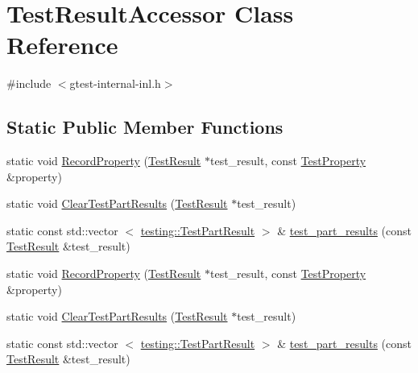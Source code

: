\hypertarget{classtesting_1_1internal_1_1TestResultAccessor}{\section{\-Test\-Result\-Accessor \-Class \-Reference}
\label{db/d32/classtesting_1_1internal_1_1TestResultAccessor}
}


{\ttfamily \#include $<$gtest-\/internal-\/inl.\-h$>$}

\subsection*{\-Static \-Public \-Member \-Functions}
\begin{DoxyCompactItemize}
\item 
static void \hyperlink{classtesting_1_1internal_1_1TestResultAccessor_ae1e40c9bdc29a0f91fc07cf688f8f66f}{\-Record\-Property} (\hyperlink{classtesting_1_1TestResult}{\-Test\-Result} $\ast$test\-\_\-result, const \hyperlink{classtesting_1_1TestProperty}{\-Test\-Property} \&property)
\item 
static void \hyperlink{classtesting_1_1internal_1_1TestResultAccessor_aa2da51f41436229f032c3ea7cffc53e1}{\-Clear\-Test\-Part\-Results} (\hyperlink{classtesting_1_1TestResult}{\-Test\-Result} $\ast$test\-\_\-result)
\item 
static const std\-::vector\*
$<$ \hyperlink{classtesting_1_1TestPartResult}{testing\-::\-Test\-Part\-Result} $>$ \& \hyperlink{classtesting_1_1internal_1_1TestResultAccessor_a018e4cce093eef01adc2d4cd6d1371bf}{test\-\_\-part\-\_\-results} (const \hyperlink{classtesting_1_1TestResult}{\-Test\-Result} \&test\-\_\-result)
\item 
static void \hyperlink{classtesting_1_1internal_1_1TestResultAccessor_ae1e40c9bdc29a0f91fc07cf688f8f66f}{\-Record\-Property} (\hyperlink{classtesting_1_1TestResult}{\-Test\-Result} $\ast$test\-\_\-result, const \hyperlink{classtesting_1_1TestProperty}{\-Test\-Property} \&property)
\item 
static void \hyperlink{classtesting_1_1internal_1_1TestResultAccessor_aa2da51f41436229f032c3ea7cffc53e1}{\-Clear\-Test\-Part\-Results} (\hyperlink{classtesting_1_1TestResult}{\-Test\-Result} $\ast$test\-\_\-result)
\item 
static const std\-::vector\*
$<$ \hyperlink{classtesting_1_1TestPartResult}{testing\-::\-Test\-Part\-Result} $>$ \& \hyperlink{classtesting_1_1internal_1_1TestResultAccessor_a018e4cce093eef01adc2d4cd6d1371bf}{test\-\_\-part\-\_\-results} (const \hyperlink{classtesting_1_1TestResult}{\-Test\-Result} \&test\-\_\-result)
\end{DoxyCompactItemize}


